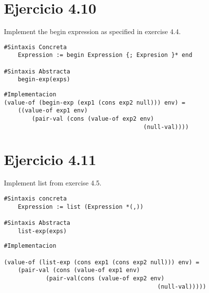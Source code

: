 \documentclass{article}
\begin{document}
\section*{Ejercicio 4.10}
Implement the begin expression as speciﬁed in exercise 4.4.

\begin{lstlisting}
#Sintaxis Concreta
    Expression := begin Expression {; Expresion }* end

#Sintaxis Abstracta
    begin-exp(exps)
\end{lstlisting}

\begin{lstlisting}
#Implementacion
(value-of (begin-exp (exp1 (cons exp2 null))) env) =
	((value-of exp1 env)
		(pair-val (cons (value-of exp2 env)
										(null-val))))
\end{lstlisting}

\section*{Ejercicio 4.11}
Implement list from exercise 4.5.



\begin{lstlisting}
#Sintaxis concreta 
    Expression := list (Expression *(,))

#Sintaxis Abstracta
    list-exp(exps)
\end{lstlisting}

\begin{lstlisting}
#Implementacion

(value-of (list-exp (cons exp1 (cons exp2 null))) env) =
	(pair-val (cons (value-of exp1 env)
			(pair-val(cons (value-of exp2 env)
											(null-val)))))
\end{lstlisting}
\end{document}
